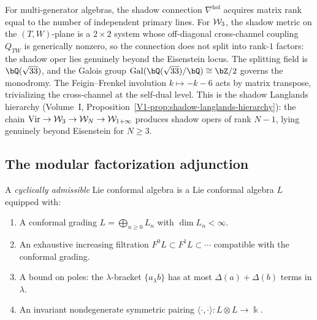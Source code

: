 \begin{remark}
\label{rem:thqg-shadow-langlands}
For multi-generator algebras, the shadow connection
$\nabla^{\mathrm{hol}}$ acquires matrix rank equal to the number
of independent primary lines. For $\mathcal{W}_3$, the shadow metric on
the $(T,W)$-plane is a $2 \times 2$ system whose off-diagonal
cross-channel coupling $Q_{TW}$ is generically nonzero, so the
connection does not split into rank-$1$ factors: the shadow oper
lies genuinely beyond the Eisenstein locus. The splitting field
is $\bQ(\sqrt{33})$, and the Galois group
$\operatorname{Gal}(\bQ(\sqrt{33})/\bQ) \cong \bZ/2$
governs the monodromy. The Feigin--Frenkel involution
$k \mapsto -k - 6$ acts by matrix transpose, trivializing
the cross-channel at the self-dual level. This is the shadow
Langlands hierarchy
(Volume~I, Proposition~\ref{V1-prop:shadow-langlands-hierarchy}):
the chain $\mathrm{Vir} \to \mathcal{W}_3 \to \mathcal{W}_N \to \mathcal{W}_{1+\infty}$
produces shadow opers of rank $N{-}1$, lying genuinely beyond
Eisenstein for $N \ge 3$.
\end{remark}


\subsection{The modular factorization adjunction}

\begin{definition}
A \emph{cyclically admissible} Lie conformal algebra is a Lie conformal
algebra $L$ equipped with:
\begin{enumerate}[label=\textup{(\roman*)}]
\item A conformal grading $L = \bigoplus_{n \ge 0} L_n$ with
 $\dim L_n < \infty$.
\item An exhaustive increasing filtration $F^0 L \subset F^1 L
 \subset \cdots$ compatible with the conformal grading.
\item A bound on poles: the $\lambda$-bracket $\{a_\lambda b\}$ has
 at most $\Delta(a) + \Delta(b)$ terms in $\lambda$.
\item An invariant nondegenerate symmetric pairing
 $\langle\cdot,\cdot\rangle: L \otimes L \to \Bbbk$.
\end{enumerate}
\end{definition}

